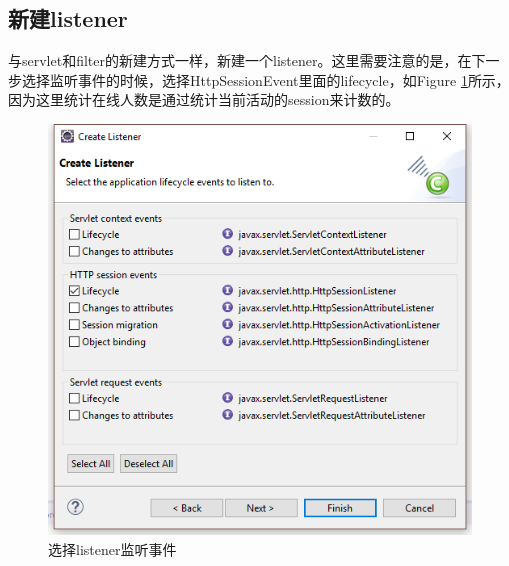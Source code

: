 \subsection{新建listener}
与servlet和filter的新建方式一样，新建一个listener。这里需要注意的是，在下一步选择监听事件的时候，选择HttpSessionEvent里面的lifecycle，如Figure \ref{listener}所示，因为这里统计在线人数是通过统计当前活动的session来计数的。
\begin{figure}
\includegraphics[width=1\linewidth]{servletListener.png}
\caption{选择listener监听事件}
\label{listener}

\end{figure}

